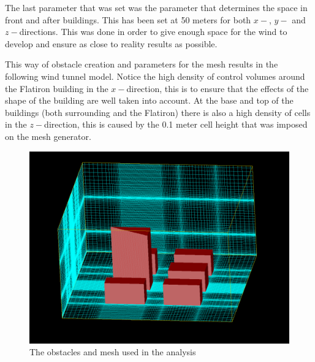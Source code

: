 The last parameter that was set was the parameter that determines the space in front and after buildings. This has been set at 50 meters for both $x-$, $y-$ and $z-$directions. This was done in order to give enough space for the wind to develop and ensure as close to reality results as possible.

This way of obstacle creation and parameters for the mesh results in the following wind tunnel model. Notice the high density of control volumes around the Flatiron building in the $x-$direction, this is to ensure that the effects of the shape of the building are well taken into account. At the base and top of the buildings (both surrounding and the Flatiron) there is also a high density of cells in the $z-$direction, this is caused by the 0.1 meter cell height that was imposed on the mesh generator. 
\begin{figure}[ht!]
\centering
\includegraphics[width = \textwidth]{mesh.png}
\caption{The obstacles and mesh used in the analysis}
\label{fig:mesh}
\end{figure}